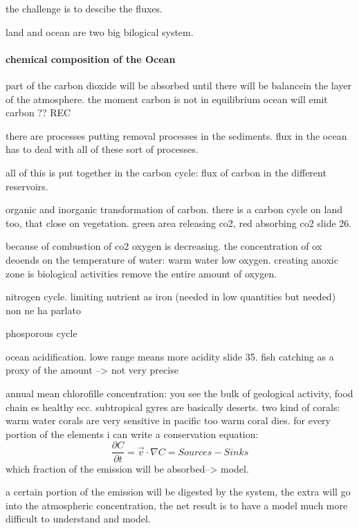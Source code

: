 the challenge is to descibe the fluxes.



land and ocean are two big bilogical system.
\paragraph{chemical composition of the Ocean}
part of the carbon dioxide will be absorbed until there will be balancein the layer of the atmosphere. the moment carbon is not in equilibrium ocean will emit carbon ?? REC

there are processes putting removal processes in the sediments. flux in the ocean has to deal with all of these sort of processes.

all of this is put together in the carbon cycle: flux of carbon in the different reservoirs.

organic and inorganic transformation of carbon. there is a carbon cycle on land too, that close on vegetation.
green area releasing co2, red absorbing co2 slide 26.

because of combustion of co2 oxygen is decreasing. the concentration of ox deoends on the temperature of water: warm water low oxygen. creating anoxic zone is biological activities remove the entire amount of oxygen.

nitrogen cycle. limiting nutrient as iron (needed in low quantities but needed) non ne ha parlato

phosporous cycle


ocean acidification. lowe range means more acidity slide 35. fish catching as a proxy of the amount --> not very precise

annual mean chlorofille concentration: you see the bulk of geological activity, food chain es healthy ecc. subtropical gyres are basically deserts.
two kind of corals: warm water corals are very sensitive in pacific too warm coral dies.
for every portion of the elements i can write a conservation equation:
$$\frac{\partial C}{\partial t}=\vec{v}\cdot \nabla C=Sources-Sinks$$
which fraction of the emission will be absorbed--> model.

a certain portion of the emission will be digested by the system, the extra will go into the atmospheric concentration, the net result is to have a model much more difficult to understand and model.

